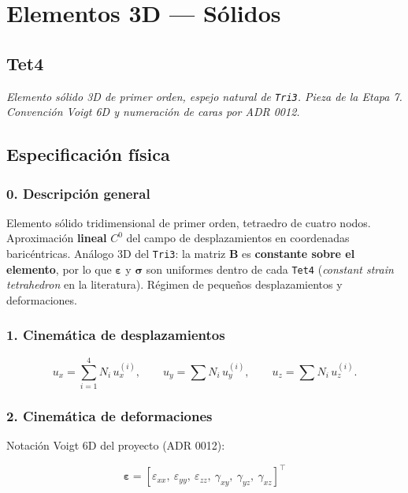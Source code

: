 \documentclass[11pt,letterpaper,oneside]{report}
\begin{document}
\newpage

\chapter{Elementos 3D — Sólidos}

\section{Tet4}



\textit{Elemento sólido 3D de primer orden, espejo natural de \texttt{Tri3}. Pieza de la Etapa 7. Convención Voigt 6D y numeración de caras por ADR 0012.}



\section{Especificación física}

\subsection{0. Descripción general}

Elemento sólido tridimensional de primer orden, tetraedro de cuatro nodos. Aproximación \textbf{lineal} $C^0$ del campo de desplazamientos en coordenadas baricéntricas. Análogo 3D del \texttt{Tri3}: la matriz $\mathbf B$ es \textbf{constante sobre el elemento}, por lo que $\boldsymbol\varepsilon$ y $\boldsymbol\sigma$ son uniformes dentro de cada \texttt{Tet4} (\textit{constant strain tetrahedron} en la literatura). Régimen de pequeños desplazamientos y deformaciones.

\subsection{1. Cinemática de desplazamientos}

\[
u_x = \sum_{i=1}^{4} N_i\, u_x^{(i)}, \qquad u_y = \sum N_i\, u_y^{(i)}, \qquad u_z = \sum N_i\, u_z^{(i)}.
\]

\subsection{2. Cinemática de deformaciones}

Notación Voigt 6D del proyecto (ADR 0012):

\[
\boldsymbol\varepsilon = [\varepsilon_{xx},\ \varepsilon_{yy},\ \varepsilon_{zz},\ \gamma_{xy},\ \gamma_{yz},\ \gamma_{xz}]^\top
\]
\end{document}
